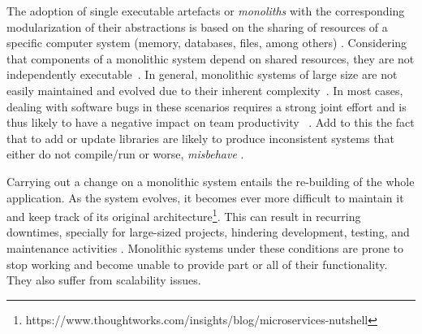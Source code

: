\documentclass[a4paper,twoside]{article}
\begin{document}

The adoption of single executable artefacts or \textit{monoliths} with the corresponding modularization of their abstractions is based on the sharing of resources of a specific computer system (memory, databases, files, among others) \cite{dragoni2017microservices}. Considering that components of a monolithic system depend on shared resources, they are not independently executable~\cite{dragoni2017microservices}\cite{richardson2014microservices}\cite{richardson2014pattern}.
In general, monolithic systems of large size are not easily maintained and evolved due to their inherent complexity~\cite{dragoni2017microservices}. In most cases, dealing with software bugs in these scenarios requires a strong joint effort and is thus likely to have a negative impact on team productivity~ \cite{dragoni2017microservices}. Add to this the fact that to add or update libraries are likely to produce inconsistent systems that either do not compile/run or worse, \textit{misbehave} \cite{dragoni2017microservices}.

Carrying out a change on a monolithic system entails the re-building of the whole application. As the system evolves, it becomes ever more difficult to maintain it and keep track of its original architecture\footnote{https://www.thoughtworks.com/insights/blog/microservices-nutshell}. This can result in recurring downtimes, specially for large-sized projects, hindering development, testing, and maintenance activities \cite{dragoni2017microservices}. Monolithic systems under these conditions are prone to stop working and become unable to provide part or all of their functionality. They also suffer from scalability issues.
\end{document}
